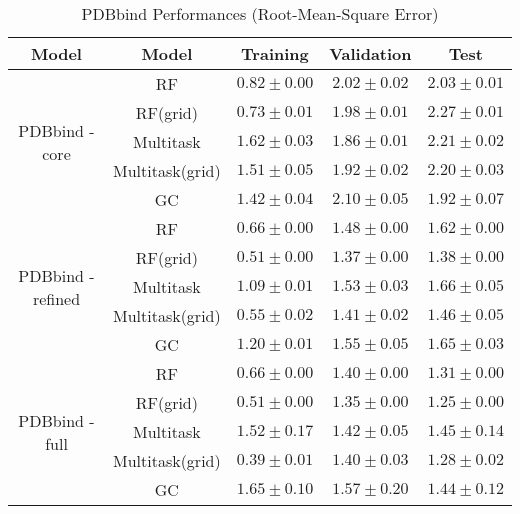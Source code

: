 \begin{table}[H]
    \small
    \centering
    \caption{PDBbind Performances (Root-Mean-Square Error)}
    \begin{tabular}{ |c|c|c|c|c| } 
    \hline
    \textbf{Model} & \textbf{Model} & \textbf{Training} & \textbf{Validation} & \textbf{Test} \\
    \hline
    \hline    
    \multirow{5}{*}{PDBbind - core}
    & RF & $0.82\pm0.00$ & $2.02\pm0.02$ & $2.03\pm0.01$ \\\cline{2-5}
    & RF(grid) & $0.73\pm0.01$ & $1.98\pm0.01$ & $2.27\pm0.01$ \\\cline{2-5}
    & Multitask & $1.62\pm0.03$ & $\mathbf{1.86\pm0.01}$ & $2.21\pm0.02$ \\\cline{2-5}
    & Multitask(grid) & $1.51\pm0.05$ & $1.92\pm0.02$ & $2.20\pm0.03$ \\\cline{2-5}
    & GC & $1.42\pm0.04$ & $2.10\pm0.05$ & $\mathbf{1.92\pm0.07}$ \\\cline{2-5}
    \hline
    \hline    
    \multirow{5}{*}{PDBbind - refined}
    & RF & $0.66\pm0.00$ & $1.48\pm0.00$ & $1.62\pm0.00$ \\\cline{2-5}
    & RF(grid) & $0.51\pm0.00$ & $\mathbf{1.37\pm0.00}$ & $\mathbf{1.38\pm0.00}$ \\\cline{2-5}
    & Multitask & $1.09\pm0.01$ & $1.53\pm0.03$ & $1.66\pm0.05$ \\\cline{2-5}
    & Multitask(grid) & $0.55\pm0.02$ & $1.41\pm0.02$ & $1.46\pm0.05$ \\\cline{2-5}
    & GC & $1.20\pm0.01$ & $1.55\pm0.05$ & $1.65\pm0.03$ \\\cline{2-5}
    \hline
    \hline    
    \multirow{5}{*}{PDBbind - full}
    & RF & $0.66\pm0.00$ & $1.40\pm0.00$ & $1.31\pm0.00$ \\\cline{2-5}
    & RF(grid) & $0.51\pm0.00$ & $\mathbf{1.35\pm0.00}$ & $\mathbf{1.25\pm0.00}$ \\\cline{2-5}
    & Multitask & $1.52\pm0.17$ & $1.42\pm0.05$ & $1.45\pm0.14$ \\\cline{2-5}
    & Multitask(grid) & $0.39\pm0.01$ & $1.40\pm0.03$ & $1.28\pm0.02$ \\\cline{2-5}
    & GC & $1.65\pm0.10$ & $1.57\pm0.20$ & $1.44\pm0.12$ \\\cline{2-5}
    \hline
    \end{tabular}
    \label{tab:PDBbind}
\end{table}
    
    
    
